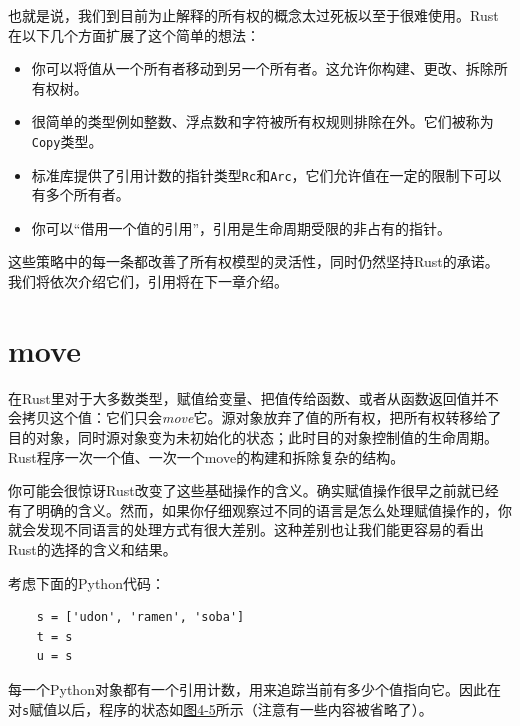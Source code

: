 也就是说，我们到目前为止解释的所有权的概念太过死板以至于很难使用。Rust在以下几个方面扩展了这个简单的想法：
\begin{itemize}
    \item 你可以将值从一个所有者移动到另一个所有者。这允许你构建、更改、拆除所有权树。
    \item 很简单的类型例如整数、浮点数和字符被所有权规则排除在外。它们被称为\texttt{Copy}类型。
    \item 标准库提供了引用计数的指针类型\texttt{Rc}和\texttt{Arc}，它们允许值在一定的限制下可以有多个所有者。
    \item 你可以“借用一个值的引用”，引用是生命周期受限的非占有的指针。
\end{itemize}

这些策略中的每一条都改善了所有权模型的灵活性，同时仍然坚持Rust的承诺。我们将依次介绍它们，引用将在下一章介绍。

\section{move}
在Rust里对于大多数类型，赋值给变量、把值传给函数、或者从函数返回值并不会拷贝这个值：它们只会\emph{move}它。源对象放弃了值的所有权，把所有权转移给了目的对象，同时源对象变为未初始化的状态；此时目的对象控制值的生命周期。Rust程序一次一个值、一次一个move的构建和拆除复杂的结构。

你可能会很惊讶Rust改变了这些基础操作的含义。确实赋值操作很早之前就已经有了明确的含义。然而，如果你仔细观察过不同的语言是怎么处理赋值操作的，你就会发现不同语言的处理方式有很大差别。这种差别也让我们能更容易的看出Rust的选择的含义和结果。

考虑下面的Python代码：
\begin{verbatim}
    s = ['udon', 'ramen', 'soba']
    t = s
    u = s
\end{verbatim}

每一个Python对象都有一个引用计数，用来追踪当前有多少个值指向它。因此在对\texttt{s}赋值以后，程序的状态如\hyperref[f4-5]{图4-5}所示（注意有一些内容被省略了）。

